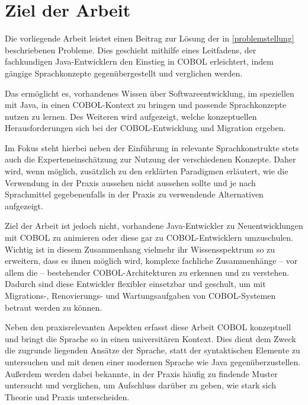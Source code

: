 \section{Ziel der Arbeit}
Die vorliegende Arbeit leistet einen Beitrag zur Lösung der in \autoref{problemstellung} beschriebenen Probleme. Dies geschieht mithilfe eines Leitfadens, der fachkundigen Java-Entwicklern den Einstieg in COBOL erleichtert, indem gängige Sprachkonzepte gegenübergestellt und verglichen werden. 

Das ermöglicht es, vorhandenes Wissen über Softwareentwicklung, im speziellen mit Java, in einen COBOL-Kontext zu bringen und passende Sprachkonzepte nutzen zu lernen. Des Weiteren wird aufgezeigt, welche konzeptuellen Herausforderungen sich bei der COBOL-Entwicklung und Migration ergeben.

Im Fokus steht hierbei neben der Einführung in relevante Sprachkonstrukte stets auch die Experteneinschätzung zur Nutzung der verschiedenen Konzepte. Daher wird, wenn möglich, zusätzlich zu den erklärten Paradigmen erläutert, wie die Verwendung in der Praxis aussehen \bzw nicht aussehen sollte und je nach Sprachmittel gegebenenfalls in der Praxis zu verwendende Alternativen aufgezeigt.

Ziel der Arbeit ist jedoch nicht, vorhandene Java-Entwickler zu Neuentwicklungen mit COBOL zu animieren oder diese gar zu COBOL-Entwicklern umzuschulen. Wichtig ist in diesem Zusammenhang vielmehr ihr Wissensspektrum so zu erweitern, dass es ihnen möglich wird, komplexe fachliche Zusammenhänge -- vor allem die  -- bestehender COBOL-Architekturen zu erkennen und zu verstehen. Dadurch sind diese Entwickler flexibler einsetzbar und geschult, um mit Migrations-, Renovierungs- und Wartungsaufgaben von COBOL-Systemen betraut werden zu können.

Neben den praxisrelevanten Aspekten erfasst diese Arbeit COBOL konzeptuell und bringt die Sprache so in einen universitären Kontext. Dies dient dem Zweck die zugrunde liegenden Ansätze der Sprache, statt der syntaktischen Elemente zu untersuchen und mit denen einer modernen Sprache wie Java gegenüberzustellen. Außerdem werden dabei bekannte, in der Praxis häufig zu findende Muster untersucht und verglichen, um Aufschluss darüber zu geben, wie stark sich Theorie und Praxis unterscheiden.